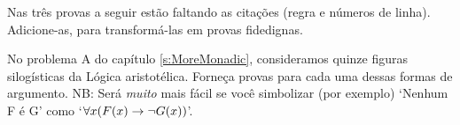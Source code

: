 \problempart 
\label{pr.justifyFOLproof}
Nas tr\^es provas a seguir est\~ao faltando as cita\c c\~oes (regra e
n\'umeros de linha). Adicione-as, para transform\'a-las em provas fidedignas.
\begin{earg}
\item \begin{fitchproof}
	\open
	\close
{} {}
\end{fitchproof}

\item \begin{fitchproof}
 {}
 {}
\end{fitchproof}

\item \begin{fitchproof}
\open
\close
{}
\end{fitchproof}
\end{earg}
 
\problempart
\label{pr.BarbaraEtc.proof1}
No problema A do cap\'itulo \ref{s:MoreMonadic}, consideramos quinze figuras silog\'isticas da L\'ogica aristot\'elica. Forne\c ca provas para cada uma dessas formas de argumento. NB: Ser\'a \emph{muito} mais f\'acil se voc\^e simbolizar (por exemplo) `Nenhum F \'e G' como `$\forall x (\mathord{F}(x) \rightarrow \neg \mathord{G}(x))$'.

